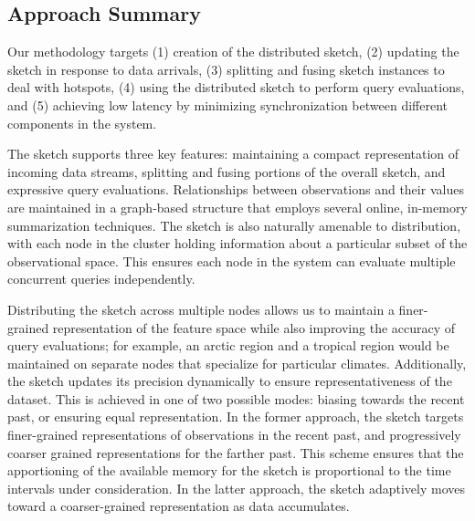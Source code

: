 \subsection{Approach Summary}
Our methodology targets (1) creation of the distributed sketch, (2) updating the sketch in response to data arrivals, (3) splitting and fusing sketch instances to deal with hotspots, (4) using the distributed sketch to perform query evaluations, and (5) achieving low latency by minimizing synchronization between different components in the system. 

The sketch supports three key features: maintaining a compact representation of incoming data streams, splitting and fusing portions of the overall sketch, and expressive query evaluations. Relationships between observations and their values are maintained in a graph-based structure that employs several online, in-memory summarization techniques. The sketch is also naturally amenable to distribution, with each node in the cluster holding information about a particular subset of the observational space.  This ensures each node in the system can evaluate multiple concurrent queries independently.

Distributing the sketch across multiple nodes allows us to maintain a finer-grained representation of the feature space while also improving the accuracy of query evaluations; for example, an arctic region and a tropical region would be maintained on separate nodes that specialize for particular climates. Additionally, the sketch updates its precision dynamically to ensure representativeness of the dataset. This is achieved in one of two possible modes: biasing towards the recent past, or ensuring equal representation. In the former approach, the sketch targets finer-grained representations of observations in the recent past, and progressively coarser grained representations for the farther past. This scheme ensures that the apportioning of the available memory for the sketch is proportional to the time intervals under consideration.  In the latter approach, the sketch adaptively moves toward a coarser-grained representation as data accumulates.

